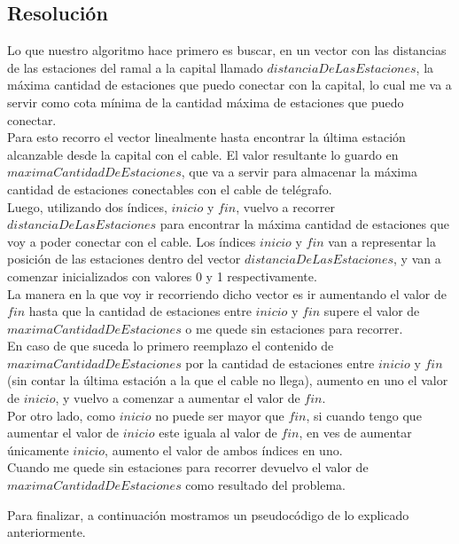 \documentclass[10pt, a4paper]{article}
\begin{document}
\subsection{Resoluci\'on}
Lo que nuestro algoritmo hace primero es buscar, en un vector con las distancias de las estaciones del ramal a la capital llamado $distanciaDeLasEstaciones$, la m\'axima cantidad de estaciones que puedo conectar con la capital, lo cual me va a servir como cota m\'inima de la cantidad m\'axima de estaciones que puedo conectar. \\Para esto recorro el vector linealmente hasta encontrar la \'ultima estaci\'on alcanzable desde la capital con el cable. El valor resultante lo guardo en $maximaCantidadDeEstaciones$, que va a servir para almacenar la m\'axima cantidad de estaciones conectables con el cable de tel\'egrafo.\\
Luego, utilizando dos \'indices, $inicio$ y $fin$, vuelvo a recorrer $distanciaDeLasEstaciones$ para encontrar la m\'axima cantidad de estaciones que voy a poder conectar con el cable. Los \'indices $inicio$ y $fin$ van a representar la posici\'on de las estaciones dentro del vector $distanciaDeLasEstaciones$, y van a comenzar inicializados con valores 0 y 1 respectivamente. \\La manera en la que voy ir recorriendo dicho vector es ir aumentando el valor de $fin$ hasta que la cantidad de estaciones entre $inicio$ y $fin$ supere el valor de $maximaCantidadDeEstaciones$ o me quede sin estaciones para recorrer.\\
En caso de que suceda lo primero reemplazo el contenido de $maximaCantidadDeEstaciones$ por la cantidad de estaciones entre $inicio$ y $fin$(sin contar la \'ultima estaci\'on a la que el cable no llega), aumento en uno el valor de $inicio$, y vuelvo a comenzar a aumentar el valor de $fin$.\\ 
Por otro lado, como $inicio$ no puede ser mayor que $fin$, si cuando tengo que aumentar el valor de $inicio$ este iguala al valor de $fin$, en ves de aumentar \'unicamente $inicio$, aumento el valor de ambos \'indices en uno.\\
Cuando me quede sin estaciones para recorrer devuelvo el valor de $maximaCantidadDeEstaciones$ como resultado del problema.\\
\begin{flushleft}
Para finalizar, a continuaci\'on mostramos un pseudoc\'odigo de lo explicado anteriormente.
\end{flushleft}
\end{document}
